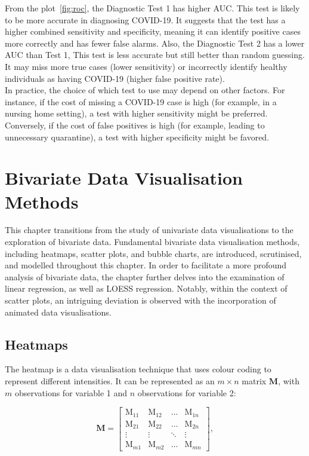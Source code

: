 \documentclass{article}\usepackage[]{graphicx}\usepackage[]{xcolor}
\numberwithin{equation}{section}
\begin{document}
\noindent
From the plot~\ref{fig:roc}, the Diagnostic Test 1 has higher AUC. This test is likely to be more accurate in diagnosing COVID-19. It suggests that the test has a higher combined sensitivity and specificity, meaning it can identify positive cases more correctly and has fewer false alarms. Also, the Diagnostic Test 2 has a lower AUC than Test 1, This test is less accurate but still better than random guessing. It may miss more true cases (lower sensitivity) or incorrectly identify healthy individuals as having COVID-19 (higher false positive rate).\\

\noindent
In practice, the choice of which test to use may depend on other factors. For instance, if the cost of missing a COVID-19 case is high (for example, in a nursing home setting), a test with higher sensitivity might be preferred. Conversely, if the cost of false positives is high (for example, leading to unnecessary quarantine), a test with higher specificity might be favored.

\newpage

\section{Bivariate Data Visualisation Methods}

\noindent This chapter transitions from the study of univariate data visualisations to the exploration of bivariate data. Fundamental bivariate data visualisation methods, including heatmaps, scatter plots, and bubble charts, are introduced, scrutinised, and modelled throughout this chapter. In order to facilitate a more profound analysis of bivariate data, the chapter further delves into the examination of linear regression, as well as LOESS regression. Notably, within the context of scatter plots, an intriguing deviation is observed with the incorporation of animated data visualisations.

\subsection{Heatmaps}
The heatmap is a data visualisation technique that uses colour coding to represent different intensities. It can be represented as an $m \times n$ matrix $\mathbf{M}$, with $m$ observations for variable 1 and $n$ observations for variable 2:

$$\mathbf{M} =
\left[
\begin{array}{cccc}
    \mathrm{M}_{11} & \mathrm{M}_{12} & \ldots & \mathrm{M}_{1n} \\  
    \mathrm{M}_{21} & \mathrm{M}_{22} & \ldots & \mathrm{M}_{2n} \\  
    \vdots & \vdots & \ddots & \vdots \\  
    \mathrm{M}_{m1} & \mathrm{M}_{m2} & \ldots & \mathrm{M}_{mn}
\end{array}
\right],
$$
\end{document}
